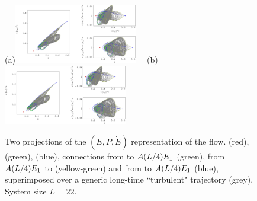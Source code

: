 \begin{figure}[t]
\begin{center}
(a)\!\!\!\!\includegraphics[width=0.48\textwidth]{figs/ks22TurbConn_xfig.eps}%
~~(b)\!\!\!\!\includegraphics[width=0.48\textwidth]{figs/ks22TurbConn_xfig.eps}
\end{center}
\caption{
Two projections of the $(E,P,\dot{E})$ representation of the flow.
 (red),  (green),  (blue),
connections from  to $A(L/4)E_{1}$ (green),
from $A(L/4)E_{1}$ to  (yellow-green)
and from  to $A(L/4)E_{1}$ (blue), superimposed over
a generic long-time ``turbulent" trajectory (grey).
System size $L=22$.
        }
\label{f:drivedragConn}
\end{figure}

